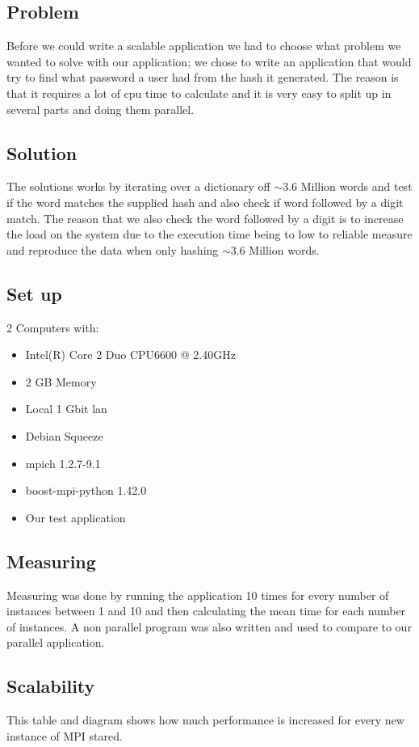 \documentclass{article}
\begin{document}
\subsection{Problem}
Before we could write a scalable application we had to choose what problem we
wanted to solve with our application; we chose to write an application that
would try to find what password a user had from the hash it generated.
The reason is that it requires a lot of cpu time to calculate and it is 
very easy to split up in several parts and doing them parallel.

\subsection{Solution}
The solutions works by iterating over a dictionary off $\sim$3.6 Million words
and test if the word matches the supplied hash and also check if word followed
by a digit match. The reason that we also check the word followed by a digit
is to increase the load on the system due to the execution time being to 
low to reliable measure and reproduce the data when only hashing $\sim$3.6
Million words.

\subsection{Set up}
2 Computers with:
\begin{itemize}
\item Intel(R) Core 2 Duo CPU6600  @ 2.40GHz
\item 2 GB Memory
\item Local 1 Gbit lan
\item Debian Squeeze
\item mpich 1.2.7-9.1
\item boost-mpi-python 1.42.0
\item Our test application \cite{pympi-test}
\end{itemize}

\subsection{Measuring}
Measuring was done by running the application 10 times for every number of
instances between 1 and 10 and then calculating the mean time for each 
number of instances. A non parallel program was also written and used to
compare to our parallel application.

\subsection{Scalability}
This table and diagram shows how much performance is increased for every
new instance of MPI stared.
\end{document}
